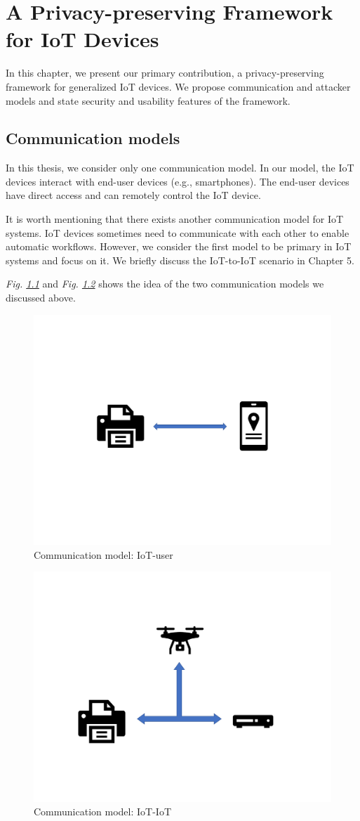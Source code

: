 \chapter{A Privacy-preserving Framework for IoT Devices}

In this chapter, we present our primary contribution, a privacy-preserving framework for generalized IoT devices. We propose communication and attacker models and state security and usability features of the framework.

\section{Communication models}

In this thesis, we consider only one communication model. In our model, the IoT devices interact with end-user devices (e.g., smartphones). The end-user devices have direct access and can remotely control the IoT device.

It is worth mentioning that there exists another communication model for IoT systems. IoT devices sometimes need to communicate with each other to enable automatic workflows. However, we consider the first model to be primary in IoT systems and focus on it. We briefly discuss the IoT-to-IoT scenario in Chapter 5. 

\textit{Fig. \ref{fig:cm1}} and \textit{Fig. \ref{fig:cm2}} shows the idea of the two communication models we discussed above. 



\begin{figure}
	\centering
		\includegraphics[width=0.6\linewidth]{comm_model_1.pdf}
		\caption{Communication model: IoT-user}
		\label{fig:cm1}
\end{figure}
\begin{figure}
	\centering
		\includegraphics[width=0.6\linewidth]{comm_model_2.pdf}
		\caption{Communication model: IoT-IoT}
		\label{fig:cm2}
\end{figure}

